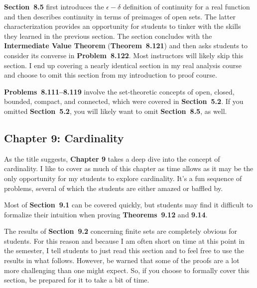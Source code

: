 \documentclass[11pt]{article}%
\newcommand{\blankline}{\pagebreak[2]\vspace{.5\baselineskip}}
\begin{document}
\blankline

\textbf{Section~8.5} first introduces the $\epsilon-\delta$ definition of continuity for a real function and then describes continuity in terms of preimages of open sets. The latter characterization provides an opportunity for students to tinker with the skills they learned in the previous section. The section concludes with the \textbf{Intermediate Value Theorem} (\textbf{Theorem~8.121}) and then asks students to consider its converse in \textbf{Problem~8.122}. Most instructors will likely skip this section. I end up covering a nearly identical section in my real analysis course and choose to omit this section from my introduction to proof course.

\blankline

\textbf{Problems~8.111--8.119} involve the set-theoretic concepts of open, closed, bounded, compact, and connected, which were covered in \textbf{Section~5.2}.  If you omitted \textbf{Section~5.2}, you will likely want to omit \textbf{Section~8.5}, as well.


\subsection*{Chapter 9: Cardinality}


As the title suggests, \textbf{Chapter 9} takes a deep dive into the concept of cardinality.  I like to cover as much of this chapter as time allows as it may be the only opportunity for my students to explore cardinality.  It's a fun sequence of problems, several of which the students are either amazed or baffled by.  

\blankline

Most of \textbf{Section~9.1} can be covered quickly, but students may find it difficult to formalize their intuition when proving \textbf{Theorems~9.12} and \textbf{9.14}.

\blankline

The results of \textbf{Section~9.2} concerning finite sets are completely obvious for students.  For this reason and because I am often short on time at this point in the semester, I tell students to just read this section and to feel free to use the results in what follows.  However, be warned that some of the proofs are a lot more challenging than one might expect.  So, if you choose to formally cover this section, be prepared for it to take a bit of time.  
\end{document}
